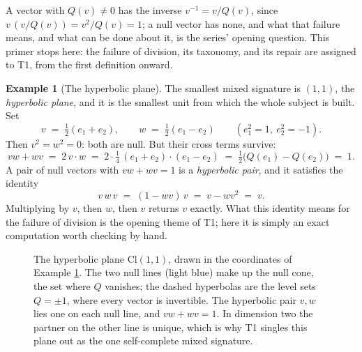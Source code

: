 \documentclass[11pt]{article}
\theoremstyle{plain}
\theoremstyle{definition}
\newtheorem{example}{Example}[section]
\newcommand{\Cl}{\mathrm{Cl}}
\begin{document}
A vector with $Q(v) \neq 0$ has the inverse $v^{-1} = v / Q(v)$, since $v\,(v/Q(v)) = v^2/Q(v) = 1$; a null vector has none, and what that failure means, and what can be done about it, is the series' opening question. This primer stops here: the failure of division, its taxonomy, and its repair are assigned to T1, from the first definition onward.

\begin{example}[The hyperbolic plane]\label{ex:hyperbolic}
The smallest mixed signature is $(1,1)$, the \emph{hyperbolic plane}, and it is the smallest unit from which the whole subject is built. Set
\[
v \;=\; \tfrac12 (e_1 + e_2), \qquad w \;=\; \tfrac12 (e_1 - e_2) \qquad (e_1^2 = 1,\ e_2^2 = -1).
\]
Then $v^{2} = w^{2} = 0$: both are null. But their cross terms survive:
\[
vw + wv \;=\; 2\, v\cdot w \;=\; 2\cdot\tfrac14\,(e_1 + e_2)\cdot(e_1 - e_2) \;=\; \tfrac12\bigl(Q(e_1) - Q(e_2)\bigr) \;=\; 1 .
\]
A pair of null vectors with $vw + wv = 1$ is a \emph{hyperbolic pair}, and it satisfies the identity
\[
v\,w\,v \;=\; (1 - wv)\,v \;=\; v - w v^2 \;=\; v .
\]
Multiplying by $v$, then $w$, then $v$ returns $v$ exactly. What this identity means for the failure of division is the opening theme of T1; here it is simply an exact computation worth checking by hand.
\end{example}

\begin{figure}[ht]
\centering
{}
\caption{The hyperbolic plane $\Cl(1,1)$, drawn in the coordinates of Example \ref{ex:hyperbolic}. The two null lines (light blue) make up the null cone, the set where $Q$ vanishes; the dashed hyperbolas are the level sets $Q = \pm 1$, where every vector is invertible. The hyperbolic pair $v, w$ lies one on each null line, and $vw + wv = 1$. In dimension two the partner on the other line is unique, which is why T1 singles this plane out as the one self-complete mixed signature.}
\label{fig:cone}
\end{figure}
\end{document}
